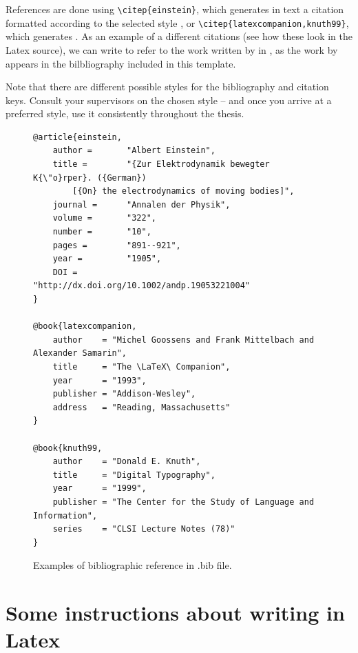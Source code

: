 References are done using \texttt{\textbackslash citep\{einstein\}}, which generates in text a citation formatted according to the selected style \citep{einstein}, or \texttt{\textbackslash citep\{latexcompanion,knuth99\}}, which generates \citep{latexcompanion,knuth99}. 
As an example of a different citations (see how these look in the Latex source), we can write \citep{einstein} to refer to the work written by \citeauthor{einstein} in \citeyear{einstein}, as the work by \citet{einstein} appears in the bilbliography included in this template.

Note that there are different possible styles for the bibliography and citation keys.
%
Consult your supervisors on the chosen style -- and once you arrive at a preferred style, use it consistently throughout the thesis.

\begin{figure}[ht]
    \centering
    \begin{scriptsize}
\begin{verbatim}
@article{einstein,
    author =       "Albert Einstein",
    title =        "{Zur Elektrodynamik bewegter K{\"o}rper}. ({German})
        [{On} the electrodynamics of moving bodies]",
    journal =      "Annalen der Physik",
    volume =       "322",
    number =       "10",
    pages =        "891--921",
    year =         "1905",
    DOI =          "http://dx.doi.org/10.1002/andp.19053221004"
}
 
@book{latexcompanion,
    author    = "Michel Goossens and Frank Mittelbach and Alexander Samarin",
    title     = "The \LaTeX\ Companion",
    year      = "1993",
    publisher = "Addison-Wesley",
    address   = "Reading, Massachusetts"
}

@book{knuth99,
    author    = "Donald E. Knuth",
    title     = "Digital Typography",
    year      = "1999",
    publisher = "The Center for the Study of Language and Information",
    series    = "CLSI Lecture Notes (78)"
}\end{verbatim}
\end{scriptsize}
    \caption{Examples of bibliographic reference in .bib file.}
    \label{bibexamples}
\end{figure}


\section{Some instructions about writing in Latex}

